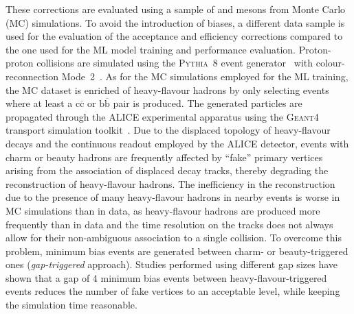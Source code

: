 These corrections are evaluated using a sample of \ds and \dpl mesons from Monte Carlo (MC) simulations. To avoid the introduction of biases, a different data sample is used for the evaluation of the acceptance and efficiency corrections compared to the one used for the ML model training and performance evaluation. Proton-proton collisions are simulated using the \textsc{Pythia~8} event generator~\cite{Bierlich:2022pfr} with colour-reconnection Mode~2~\cite{Christiansen:2015yqa}. As for the MC simulations employed for the ML training, the MC dataset is enriched of heavy-flavour hadrons by only selecting events where at least a $\mathrm{c\overline{c}}$ or $\mathrm{b\overline{b}}$ pair is produced. The generated particles are propagated through the ALICE experimental apparatus using the \textsc{Geant4} transport simulation toolkit~\cite{GEANT4:2002zbu}. Due to the displaced topology of heavy-flavour decays and the continuous readout employed by the ALICE detector, events with charm or beauty hadrons are frequently affected by ``fake'' primary vertices arising from the association of displaced decay tracks, thereby degrading the reconstruction of heavy-flavour hadrons. The inefficiency in the reconstruction due to the presence of many heavy-flavour hadrons in nearby events is worse in MC simulations than in data, as heavy-flavour hadrons are produced more frequently than in data and the time resolution on the tracks does not always allow for their non-ambiguous association to a single collision. To overcome this problem, minimum bias events are generated between charm- or beauty-triggered ones (\emph{gap-triggered} approach). Studies performed using different gap sizes have shown that a gap of 4 minimum bias events between heavy-flavour-triggered events reduces the number of fake vertices to an acceptable level, while keeping the simulation time reasonable.

